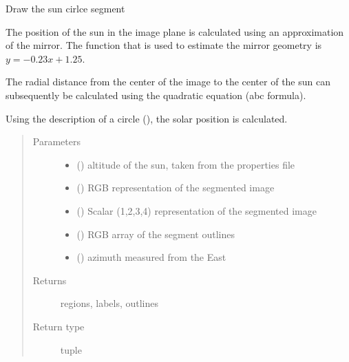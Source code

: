 \documentclass[letterpaper,10pt,english]{sphinxmanual}
\begin{document}
\begin{fulllineitems}
\label{\detokenize{createregions:createregions.sun_circle}}
Draw the sun cirlce segment

The position of the sun in the image plane is calculated using an approximation of the mirror. The function that is
used to estimate the mirror geometry is \(y = -0.23x+1.25\).

The radial distance from the center of the image to the center of the sun can subsequently be calculated using
the quadratic equation (abc formula).

Using the description of a circle ({\hyperref[\detokenize{createmask:createmask.calculate_band_position}]{}}), the solar position is calculated.
\begin{quote}\begin{description}
\item[{Parameters}] \leavevmode\begin{itemize}
\item {} 
 () \textendash{} altitude of the sun, taken from the properties file

\item {} 
 () \textendash{} RGB representation of the segmented image

\item {} 
 () \textendash{} Scalar (1,2,3,4) representation of the segmented image

\item {} 
 () \textendash{} RGB array of the segment outlines

\item {} 
 () \textendash{} azimuth measured from the East

\end{itemize}

\item[{Returns}] \leavevmode
regions, labels, outlines

\item[{Return type}] \leavevmode
tuple

\end{description}\end{quote}

\end{fulllineitems}
\end{document}
